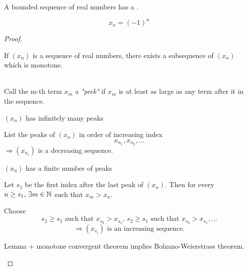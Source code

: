 \documentclass[a4paper,12pt]{article}
\begin{document}
\begin{theorem}
    A bounded sequence of real numbers has a .
    \begin{example}
        \[x_n = (-1)^n\]
    \end{example}
    \begin{proof}
        \begin{lemma}
            If \((x_n)\) is a sequence of real numbers, there exists a subsequence of \((x_n)\) which is monotone.
        \end{lemma}
        \\
        Call the m-th term \(x_m\) a \textit{"peek"} if \(x_m\) is at least as large as any term after it in the sequence.
        
        \begin{center}
        \end{center}

        \((x_n)\) has infinitely many peaks

        List the peaks of \((x_n)\) in order of increasing index \[x_{n_1},x_{n_2},\dots\]
        \(\Rightarrow (x_{n_i})\) is a decreasing sequence.

        \((x_n)\) has a finite number of peaks

        Let \(s_1\) be the first index after the last peak of \((x_n)\). Then for every \(n\ge s_1, \,\exists m\in\mathbb{N}\) such that \(x_m>x_n\).

        Choose \[s_2\ge s_1\text{ such that } x_{s_2}>x_{s_1},\, s_2\ge s_1\text{ such that } x_{s_2}>x_{s_1},\dots\]
        \[\Rightarrow (x_{s_i}) \text{ is an increasing sequence.}\]
        \begin{remark}
            Lemma + monotone convergent theorem implies Bolzano-Weierstrass theorem.
        \end{remark}


\end{proof}
\end{theorem}
\end{document}
